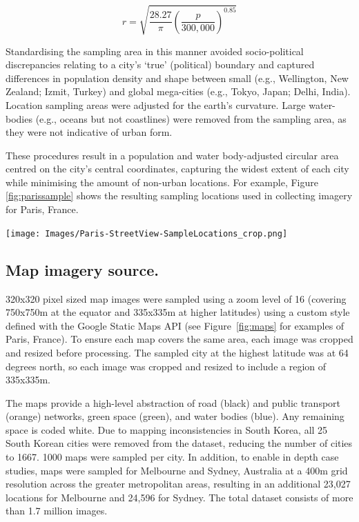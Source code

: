 \documentclass{nature}
\makeatletter
\renewenvironment*{figure}{\@float{figure}}{\end@float}
\makeatother
\begin{document}
\begin{methods}
\begin{equation}
r = \sqrt{ \frac{28.27}{\pi} \left( \frac{p}{300,000}  \right) ^{0.85} }
\end{equation}


Standardising the sampling area in this manner avoided socio-political discrepancies relating to a city's `true' (political) boundary and captured differences in population density and shape between small (e.g., Wellington, New Zealand; Izmit, Turkey) and global mega-cities (e.g., Tokyo, Japan;  Delhi, India). Location sampling areas were adjusted for the earth's curvature\cite{Sinnott1984}. Large water-bodies (e.g., oceans but not coastlines) were removed from the sampling area, as they were not indicative of urban form. 

These procedures result in a population and water body-adjusted circular area centred on the city's central coordinates, capturing the widest extent of each city while minimising the amount of non-urban locations. For example, Figure \ref{fig:parissample} shows the resulting sampling locations used in collecting imagery for Paris, France. 

\begin{figure}
    \centering    
\texttt{[image: Images/Paris-StreetView-SampleLocations\_crop.png]}  
\caption{\bf Sampling locations for map imagery (from Paris, France)\cite{GoogleStatic2017}.}    
 \label{fig:parissample}  
\end{figure} 



\subsection{Map imagery source.}\label{methodsimagery}

320x320 pixel sized map images were sampled using a zoom level of 16 (covering 750x750m at the equator and 335x335m at higher latitudes) using a custom style defined with the Google Static Maps API\cite{GoogleStatic2017} (see Figure~\ref{fig:maps} for examples of Paris, France). To ensure each map covers the same area, each image was cropped and resized before processing. The sampled city at the highest latitude was at 64 degrees north, so each image was cropped and resized to include a region of 335x335m. 

The maps provide a high-level abstraction of road (black) and public transport (orange) networks, green space (green), and water bodies (blue). Any remaining space is coded white. Due to mapping inconsistencies in South Korea, all 25 South Korean cities were removed from the dataset, reducing the number of cities to 1667. 1000 maps were sampled per city. In addition, to enable in depth case studies, maps were sampled for Melbourne and Sydney, Australia at a 400m grid resolution across the greater metropolitan areas, resulting in an additional 23,027 locations for Melbourne and 24,596 for Sydney. The total dataset consists of more than 1.7 million images.




\end{methods}
\end{document}

